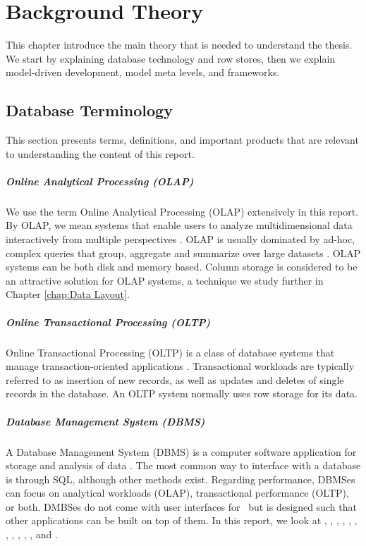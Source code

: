\chapter{Background Theory}
\label{chap:background}

This chapter introduce the main theory that is needed to understand the thesis. We start by explaining database technology and row stores, then we explain model-driven development, model meta levels, and frameworks.

\clearpage

\section{Database Terminology}
\label{sec:Database Terminology}
This section presents terms, definitions, and important products that are relevant to understanding the content of this report.

\paragraph{Online Analytical Processing (OLAP)}
\label{par:Online Analytical Processing (OLAP)}
  We use the term Online Analytical Processing (OLAP) extensively in this report. By OLAP, we mean systems that enable users to analyze multidimensional data interactively from multiple perspectives \cite{Wikipedia_contributors2015-hw}. OLAP is usually dominated by ad-hoc, complex queries that group, aggregate and summarize over large datasets \cite{Bjorklund2011-wh}. OLAP systems can be both disk and memory based. Column storage is considered to be an attractive solution for OLAP systems, a technique we study further in Chapter \ref{chap:Data Layout}.


\paragraph{Online Transactional Processing (OLTP)}
\label{par:Online Transactional Processing (OLTP)}
Online Transactional Processing (OLTP) is a class of database systems that manage transaction-oriented applications \cite{Wikipedia_contributors2015-cw}. Transactional workloads are typically referred to as insertion of new records, as well as updates and deletes of single records in the database. An OLTP system normally uses row storage for its data.

\paragraph{Database Management System (DBMS)}
\label{par:Database Management System (DBMS)}
A Database Management System (DBMS) is a computer software application for storage and analysis of data \cite{Wikipedia_contributors2015-pb}. The most common way to interface with a database is through SQL, although other methods exist. Regarding performance, DBMSes can focus on analytical workloads (OLAP), transactional performance (OLTP), or both. DMBSes do not come with user interfaces for \bd~but is designed such that other applications can be built on top of them. In this report, we look at \oracle, \ibm, \saph, \sapnw, \mssql, \cstore, \vertica, \blink, \exasol, \oracle, \hyper, and \hyrise.

